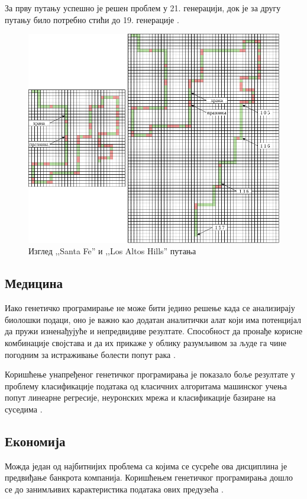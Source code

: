 \documentclass[a4paper]{article}
\begin{document}
За прву путању успешно је решен проблем у 21. генерацији, док је за другу путању било потребно стићи до 19. генерације \cite{koza}.

\begin{figure}[ht!]
    \begin{center}
        \includegraphics[scale=0.35]{santa_fe.png}
    \end{center}
    \caption{Изглед ,,Santa Fe'' и ,,Los Altos Hills'' путања}
    \label{fig:santa_fe}
\end{figure}

\subsection{Медицина}
Иако генетичко програмирање не може бити једино решење када се анализирају биолошки подаци, оно је важно као додатан аналитички алат који има потенцијал да пружи изненађујуће и непредвидиве резултате. Способност да пронађе корисне комбинације својстава и да их прикаже у облику разумљивом за људе га чине погодним за истраживање болести попут рака \cite{cancer}.

Коришћење унапређеног генетичког програмирања је показало боље резултате у проблему класификације података од класичних алгоритама машинског учења попут линеарне регресије, неуронских мрежа и класификације базиране на суседима \cite{egp}.
\subsection{Економија}
Можда један од најбитнијих проблема са којима се сусреће ова дисциплина је предвиђање банкрота компанија. Коришћењем генетичког програмирања дошло се до занимљивих карактеристика података ових предузећа \cite{bankruptcy}.
\end{document}
